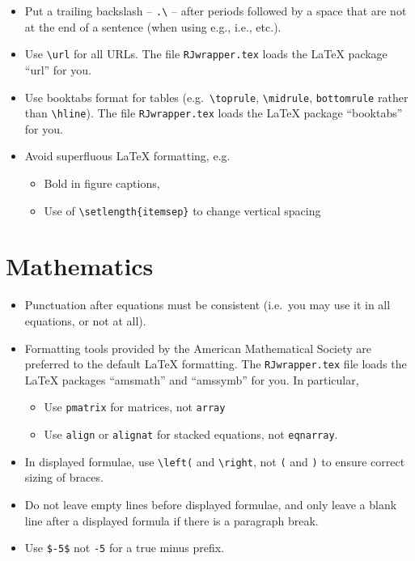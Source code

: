 \documentclass[11pt]{article}
\begin{document}
\begin{itemize}
\item Put a trailing backslash -- \verb+.\+ -- after periods followed
  by a space that are not at the end of a sentence (when using e.g.,
  i.e., etc.).
\item Use \verb+\url+ for all URLs. The file \texttt{RJwrapper.tex} 
  loads the LaTeX package ``url'' for you.
\item Use booktabs format for tables (e.g.\ \verb+\toprule+, 
  \verb+\midrule+, \verb+bottomrule+ rather than \verb+\hline+).
  The file \texttt{RJwrapper.tex} loads the LaTeX package ``booktabs''
  for you.
\item Avoid superfluous LaTeX formatting, e.g.
  \begin{itemize}
  \item Bold in figure captions,
  \item Use of \verb+\setlength{itemsep}+ to change vertical spacing
  \end{itemize}
\end{itemize}

\section*{Mathematics}

\begin{itemize}
\item Punctuation after equations must be consistent (i.e.\ you may
  use it in all equations, or not at all).
\item Formatting tools provided by the American Mathematical Society
  are preferred to the default LaTeX formatting. The
  \texttt{RJwrapper.tex} file loads the LaTeX packages ``amsmath'' and
  ``amssymb'' for you. In particular,
  \begin{itemize}
  \item Use \verb+pmatrix+ for matrices, not \verb+array+
  \item Use \verb+align+ or \verb+alignat+ for stacked equations,
    not \verb+eqnarray+.
  \end{itemize}
\item In displayed formulae, use \verb+\left(+ and \verb+\right+, not
  \verb+(+ and \verb+)+ to ensure correct sizing of braces.
\item Do not leave empty lines before displayed formulae, and only
  leave a blank line after a displayed formula if there is a paragraph
  break.
\item Use \verb+$-5$+ not \verb+-5+ for a true minus prefix.
\end{itemize}
\end{document}
